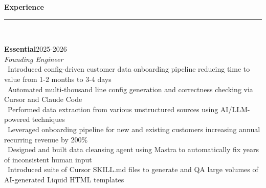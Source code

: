 \documentclass[a4paper,10pt]{article}
\newcommand{\horizontalline}{{\rule{533pt}{0.625pt}\\}}
\renewcommand{\section}[1]{{\noindent\textbf{\large #1}\\\horizontalline}}
\renewcommand{\subsection}[2]{{\noindent \textbf{#1}\hfill \textsc{#2}\\}}
\begin{document}
\par{ \par}
\par{ \par}
\bigskip
\bigskip

\section{Experience}
\subsection{Essential}{2025-2026}
\textit{Founding Engineer}\\
\textbullet\ Introduced config-driven customer data onboarding pipeline reducing time to value from 1-2 months to 3-4 days\\
\textbullet\ Automated multi-thousand line config generation and correctness checking via Cursor and Claude Code\\
\textbullet\ Performed data extraction from various unstructured sources using AI/LLM-powered techniques\\
\textbullet\ Leveraged onboarding pipeline for new and existing customers increasing annual recurring revenue by 200\%\\
\textbullet\ Designed and built data cleansing agent using Mastra to automatically fix years of inconsistent human input\\
\textbullet\ Introduced suite of Cursor SKILL.md files to generate and QA large volumes of AI-generated Liquid HTML templates\\
\end{document}

